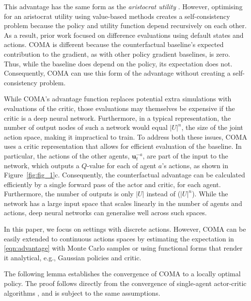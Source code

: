 \documentclass[letterpaper]{article}
\newcommand{\citep}{\cite}
\newcommand{\myvec}[1]{\mathbf{#1}}
\newcommand{\vu}{\myvec{u}}
\begin{document}
This advantage has the same form as the \emph{aristocrat utility} 
\citep{wolpert2002optimal}. However, optimising for an aristocrat utility using 
value-based methods creates a self-consistency problem because the policy and utility 
function depend recursively on each other. As a result, prior work focused
on difference evaluations using default states and actions. COMA is different because the
 counterfactual baseline's expected contribution to the gradient, as with other policy gradient baselines, is zero.  Thus, while
the baseline does depend on the policy, its expectation does not. Consequently, COMA can use 
this form of the advantage without creating a self-consistency problem.

While COMA's advantage function replaces potential extra simulations with 
evaluations of the critic, those evaluations may themselves be expensive if the 
critic is a deep neural network.  Furthermore, in a typical representation, the 
number of output nodes of such a network would equal $\vert U \vert ^ n$, the 
size of the joint action space, making it impractical to train.  To address 
both these issues, COMA uses a critic representation that allows for efficient 
evaluation of the baseline. In particular, the actions of the other agents, 
$\vu^{-a}_t$, are part of the input to the network, which outputs a $Q$-value 
for each of agent $a$'s actions, as shown in Figure~\ref{fig:fig_1}c. 
Consequently, the counterfactual advantage can be calculated efficiently by a 
single forward pass of the actor and critic, for each agent. Furthermore, the 
number of outputs is only $\vert U \vert$ instead of ($\vert U \vert ^ n$). 
While the network has a large input space that scales linearly in the number of 
agents and actions, deep neural networks can generalise well across such spaces.

In this paper, we focus on settings with discrete actions. However, COMA can be 
easily extended to continuous actions spaces by estimating the expectation in  
\eqref{eqn:advantage} with Monte Carlo samples or using functional forms that 
render it analytical, e.g., Gaussian policies and critic.

The following lemma establishes the convergence of COMA to a locally optimal policy.  The proof follows directly 
from the convergence of single-agent actor-critic algorithms 
\citep{sutton1999policy,konda2000actor}, and is subject to the same assumptions.
\end{document}
